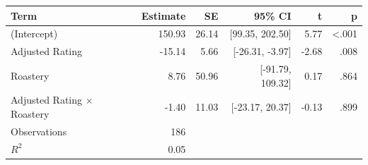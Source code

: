 \begin{tabular}{lrrrrr}
\toprule
Term & Estimate & SE & 95\% CI & t & p \\
\midrule
(Intercept) & 150.93 & 26.14 & [99.35, 202.50] & 5.77 & <.001 \\
Adjusted Rating & -15.14 & 5.66 & [-26.31, -3.97] & -2.68 & .008 \\
Roastery & 8.76 & 50.96 & [-91.79, 109.32] & 0.17 & .864 \\
Adjusted Rating $\times$ Roastery & -1.40 & 11.03 & [-23.17, 20.37] & -0.13 & .899 \\
Observations & 186 &  &  &  &  \\
$R^2$ & 0.05 &  &  &  &  \\
\bottomrule
\end{tabular}

